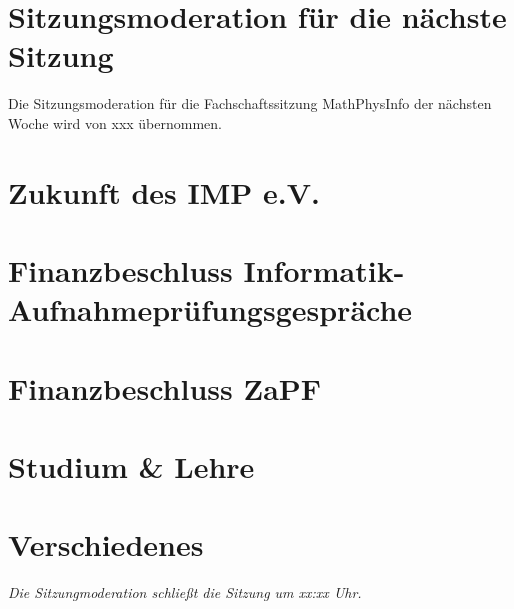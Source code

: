 \documentclass[11pt, fachschaft=mathphys,twosided=true]{mathphys/mathphys-article}
\begin{document}
\section{Sitzungsmoderation für die nächste Sitzung}
    Die Sitzungsmoderation für die Fachschaftssitzung MathPhysInfo der nächsten Woche wird von xxx übernommen. %

\section{Zukunft des IMP e.V.}

\section{Finanzbeschluss Informatik-Aufnahmeprüfungsgespräche}

\section{Finanzbeschluss ZaPF}

\section{Studium \& Lehre}

\section{Verschiedenes}



\emph{Die Sitzungmoderation schließt die Sitzung um xx:xx Uhr.}
\end{document}
